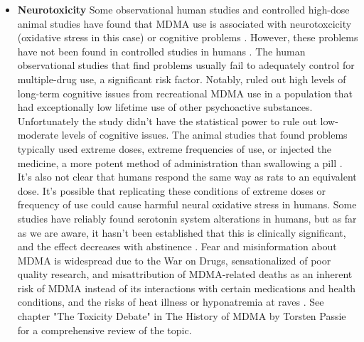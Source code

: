 \documentclass[12pt,letterpaper]{book}
\begin{document}
\begin{itemize}
    \item \textbf{Neurotoxicity}
    	Some observational human studies and controlled high-dose animal studies have found that MDMA use is associated with neurotoxcicity (oxidative stress in this case) or cognitive problems \cite{passieHistory}. However, these problems have not been found in controlled studies in humans \cite{halpernMormonRavers}. The human observational studies that find problems usually fail to adequately control for multiple-drug use, a significant risk factor. Notably, \textcite{halpernMormonRavers} ruled out high levels of long-term cognitive issues from recreational MDMA use in a population that had exceptionally low lifetime use of other psychoactive substances. Unfortunately the study didn't have the statistical power to rule out low-moderate levels of cognitive issues. The animal studies that found problems typically used extreme doses, extreme frequencies of use, or injected the medicine, a more potent method of administration than swallowing a pill \cite{passieHistory}. It's also not clear that humans respond the same way as rats to an equivalent dose. It's possible that replicating these conditions of extreme doses or frequency of use could cause harmful neural oxidative stress in humans. Some studies have reliably found serotonin system alterations in humans, but as far as we are aware, it hasn't been established that this is clinically significant, and the effect decreases with abstinence \cite{gouzoulis2006neurotoxicity}. Fear and misinformation about MDMA is widespread due to the War on Drugs, sensationalized of poor quality research, and misattribution of MDMA-related deaths as an inherent risk of MDMA instead of its interactions with certain medications and health conditions, and the risks of heat illness or hyponatremia at raves \cite{passieHistory}. See chapter "The Toxicity Debate" in The History of MDMA by Torsten Passie for a comprehensive review of the topic.
	

\end{itemize}
\end{document}
